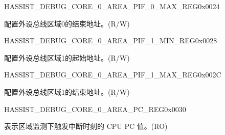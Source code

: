 \begin{register}{H}{ASSIST\_DEBUG\_CORE\_0\_AREA\_PIF\_0\_MAX\_REG}{0x0024}\label{regdesc:ASSISTDEBUGCORE0AREAPIF0MAXREG}
%
\regnewline%
\begin{regdesc}\begin{reglist}
\label{fielddesc:ASSISTDEBUGCORE0AREAPIF0MAX}\item [ASSIST\_DEBUG\_CORE\_0\_AREA\_PIF\_0\_MAX] 配置外设总线区域0的结束地址。(R/W)
\end{reglist}\end{regdesc}
\end{register}


\begin{register}{H}{ASSIST\_DEBUG\_CORE\_0\_AREA\_PIF\_1\_MIN\_REG}{0x0028}\label{regdesc:ASSISTDEBUGCORE0AREAPIF1MINREG}
%
\regnewline%
\begin{regdesc}\begin{reglist}
\label{fielddesc:ASSISTDEBUGCORE0AREAPIF1MIN}\item [ASSIST\_DEBUG\_CORE\_0\_AREA\_PIF\_1\_MIN] 配置外设总线区域1的起始地址。(R/W)
\end{reglist}\end{regdesc}
\end{register}


\begin{register}{H}{ASSIST\_DEBUG\_CORE\_0\_AREA\_PIF\_1\_MAX\_REG}{0x002C}\label{regdesc:ASSISTDEBUGCORE0AREAPIF1MAXREG}
%
\regnewline%
\begin{regdesc}\begin{reglist}
\label{fielddesc:ASSISTDEBUGCORE0AREAPIF1MAX}\item [ASSIST\_DEBUG\_CORE\_0\_AREA\_PIF\_1\_MAX] 配置外设总线区域1的结束地址。(R/W)
\end{reglist}\end{regdesc}
\end{register}


\begin{register}{H}{ASSIST\_DEBUG\_CORE\_0\_AREA\_PC\_REG}{0x0030}\label{regdesc:ASSISTDEBUGCORE0AREAPCREG}
%
\regnewline%
\begin{regdesc}\begin{reglist}
\label{fielddesc:ASSISTDEBUGCORE0AREAPC}\item [ASSIST\_DEBUG\_CORE\_0\_AREA\_PC] 表示区域监测下触发中断时刻的 CPU PC 值。(RO)
\end{reglist}\end{regdesc}
\end{register}


